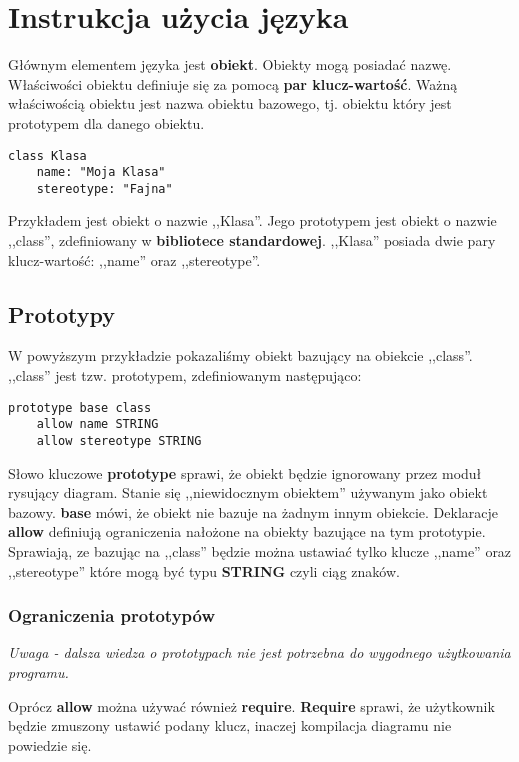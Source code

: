 \section{Instrukcja użycia języka}

Głównym elementem języka jest \textbf{obiekt}. Obiekty mogą posiadać nazwę. Właściwości obiektu definiuje się za pomocą \textbf{par klucz-wartość}. Ważną właściwością obiektu jest nazwa obiektu bazowego, tj. obiektu który jest prototypem dla danego obiektu.

\begin{lstlisting}
class Klasa
	name: "Moja Klasa"
	stereotype: "Fajna"
\end{lstlisting}

Przykładem jest obiekt o nazwie ,,Klasa''. Jego prototypem jest obiekt o nazwie ,,class'', zdefiniowany w \textbf{bibliotece standardowej}. ,,Klasa'' posiada dwie pary klucz-wartość: ,,name'' oraz ,,stereotype''.

\subsection{Prototypy}

W powyższym przykładzie pokazaliśmy obiekt bazujący na obiekcie ,,class''. ,,class'' jest tzw. prototypem, zdefiniowanym następująco:

\begin{lstlisting}
prototype base class
    allow name STRING
    allow stereotype STRING
\end{lstlisting}

Słowo kluczowe \textbf{prototype} sprawi, że obiekt będzie ignorowany przez moduł rysujący diagram. Stanie się ,,niewidocznym obiektem'' używanym jako obiekt bazowy. \textbf{base} mówi, że obiekt nie bazuje na żadnym innym obiekcie. Deklaracje \textbf{allow} definiują ograniczenia nałożone na obiekty bazujące na tym prototypie. Sprawiają, ze bazując na ,,class'' będzie można ustawiać tylko klucze ,,name'' oraz ,,stereotype'' które mogą być typu \textbf{STRING} czyli ciąg znaków.

\subsubsection{Ograniczenia prototypów}

\emph{Uwaga - dalsza wiedza o prototypach nie jest potrzebna do wygodnego użytkowania programu.}

Oprócz \textbf{allow} można używać również \textbf{require}. \textbf{Require} sprawi, że użytkownik będzie zmuszony ustawić podany klucz, inaczej kompilacja diagramu nie powiedzie się.

